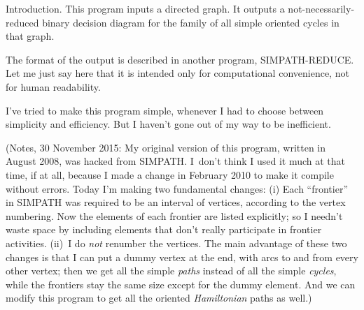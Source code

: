 
\datethis





Introduction. This program inputs a directed graph.
It outputs a not-necessarily-reduced binary decision diagram
for the family of all simple oriented cycles in that graph.

The format of the output is described in another program,
{\mc SIMPATH-REDUCE}. Let me just say here that it is intended
only for computational convenience, not for human readability.

I've tried to make this program simple, whenever I had to
choose between simplicity and efficiency. But I haven't gone
out of my way to be inefficient.

(Notes, 30 November 2015: My original version of this program,
written in August 2008, was hacked from {\mc SIMPATH}. I~don't
think I used it much at that time, if at all, because
I made a change in February 2010 to make it compile without
errors. Today I'm making two fundamental changes:
(i) Each ``frontier'' in {\mc SIMPATH} was required
to be an interval of vertices, according to the vertex numbering.
Now the elements of each frontier are listed explicitly; so
I needn't waste space by including elements that don't really
participate in frontier activities. (ii)~I do {\it not\/}
renumber the vertices.
The main advantage of these two changes is
that I can put a dummy vertex at the end, with arcs to and from
every other vertex; then we get all the simple {\it paths\/} instead
of all the simple {\it cycles}, while the frontiers stay the same size
except for the dummy element. And we can modify this program to get all
the oriented {\it Hamiltonian\/} paths as well.)

